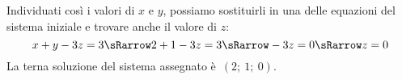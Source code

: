 \begin{esempio}{}{}
Individuati così i valori di \(x\) e \(y\), possiamo sostituirli in una 
delle equazioni del sistema iniziale e trovare anche il valore di \(z\):
\[x+y-3z=3 \sRarrow 2+1-3z=3 \sRarrow -3z=0 \sRarrow z=0\]
La terna soluzione del sistema assegnato è~\((2;~1;~0)\).
 \end{esempio}

% 
% 
% 
% 
% 
% 
% 
% 

